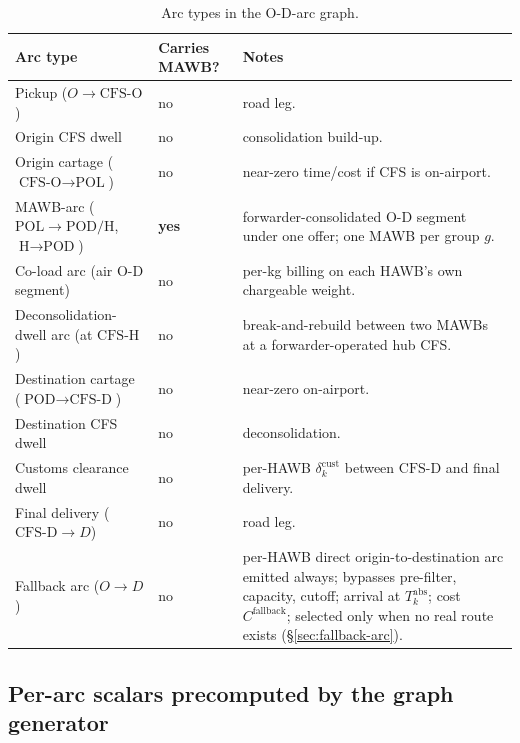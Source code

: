 \documentclass[11pt,a4paper]{article}
\theoremstyle{definition}
\begin{document}
\begin{table}[H]
\centering
\caption{Arc types in the O-D-arc graph.}
\label{tab:arc-types}
\begin{tabular}{lp{2.0cm}p{6.5cm}}
\toprule
Arc type & Carries MAWB? & Notes \\
\midrule
Pickup ($O \to \text{CFS-O}$) & no & road leg. \\
Origin CFS dwell & no & consolidation build-up. \\
Origin cartage ($\text{CFS-O} \to \text{POL}$) & no & near-zero time/cost if CFS is on-airport. \\
MAWB-arc ($\text{POL} \to \text{POD}/\text{H}$, $\text{H} \to \text{POD}$) & \textbf{yes} & forwarder-consolidated O-D segment under one offer; one MAWB per group $g$. \\
Co-load arc (air O-D segment) & no & per-kg billing on each HAWB's own chargeable weight. \\
Deconsolidation-dwell arc (at $\text{CFS-H}$) & no & break-and-rebuild between two MAWBs at a forwarder-operated hub CFS. \\
Destination cartage ($\text{POD} \to \text{CFS-D}$) & no & near-zero on-airport. \\
Destination CFS dwell & no & deconsolidation. \\
Customs clearance dwell & no & per-HAWB $\delta^{\text{cust}}_k$ between $\text{CFS-D}$ and final delivery. \\
Final delivery ($\text{CFS-D} \to D$) & no & road leg. \\
Fallback arc ($O \to D$) & no & per-HAWB direct origin-to-destination arc emitted always; bypasses pre-filter, capacity, cutoff; arrival at $T_k^{\text{abs}}$; cost $C^{\text{fallback}}$; selected only when no real route exists (\S\ref{sec:fallback-arc}). \\
\bottomrule
\end{tabular}
\end{table}

\subsection{Per-arc scalars precomputed by the graph generator}
\end{document}
